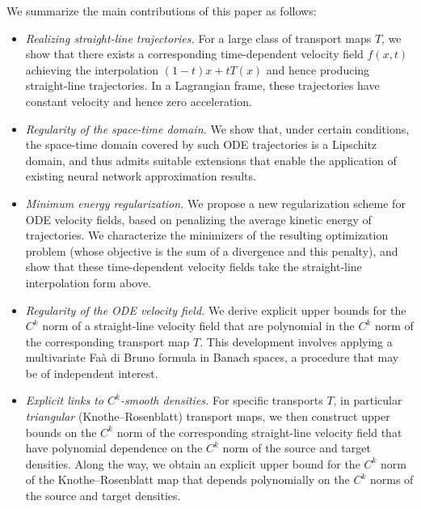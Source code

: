 We summarize the main contributions of this paper as follows: %
\begin{itemize}

\item \textit{Realizing straight-line trajectories.} For a large class of transport maps $T$, we show that there exists a corresponding time-dependent velocity field $f(x,t)$ achieving the interpolation $(1-t)x + tT(x)$ and hence producing straight-line trajectories. In a Lagrangian frame, these trajectories have constant velocity and hence zero acceleration.

\item \textit{Regularity of the space-time domain.} We show that, under certain conditions, the space-time domain covered by such ODE trajectories is a Lipschitz domain, and thus admits suitable extensions that enable the application of existing neural network approximation results.

\item \textit{Minimum energy regularization.} We propose a new regularization scheme for ODE velocity fields, based on penalizing the average kinetic energy of trajectories. We characterize the minimizers of the resulting optimization problem (whose objective is the sum of a divergence and this penalty), and show that these time-dependent velocity fields take the straight-line interpolation form above.

\item \textit{Regularity of the ODE velocity field.} We derive explicit upper bounds for the $C^k$ norm of a straight-line velocity field that are polynomial in the $C^k$ norm of the corresponding transport map $T$. This development involves applying a multivariate Fa\`{a} di Bruno formula in Banach spaces, a procedure that may be of independent interest. %

\item \textit{Explicit links to $C^k$-smooth densities.} 
For specific transports $T$, in particular \emph{triangular} (Knothe--Rosenblatt) transport maps, we then construct upper bounds on the $C^k$ norm of the corresponding {straight-line} velocity field that 
have polynomial dependence on
the $C^k$ norm of
the source and target densities. Along the way, we obtain an explicit upper bound for the $C^k$ norm of the Knothe--Rosenblatt map that depends polynomially on the $C^k$ norms %
of the source and target densities.


\end{itemize}
